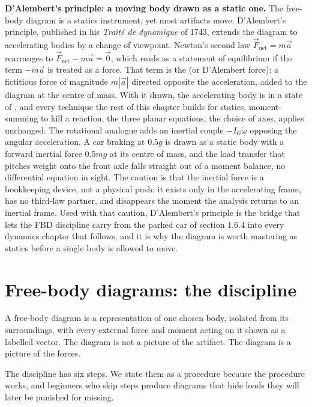 \begin{mastery}
\textbf{D'Alembert's principle: a moving body drawn as a static one.} The
free-body diagram is a statics instrument, yet most artifacts move. D'Alembert's
principle, published in his \emph{Trait\'e de dynamique} of 1743, extends the
diagram to accelerating bodies by a change of viewpoint. Newton's second law
$\vec{F}_{\text{net}} = m\vec{a}$ rearranges to $\vec{F}_{\text{net}} - m\vec{a}
= \vec{0}$, which reads as a statement of equilibrium if the term $-m\vec{a}$ is
treated as a force. That term is the  (or D'Alembert
force): a fictitious force of magnitude $m|\vec{a}|$ directed opposite the
acceleration, added to the diagram at the centre of mass. With it drawn, the
accelerating body is in a state of , and every
technique the rest of this chapter builds for statics, moment-summing to kill a
reaction, the three planar equations, the choice of axes, applies unchanged.
The rotational analogue adds an inertial couple $-I_G\dot\omega$ opposing the
angular acceleration. A car braking at $0.5g$ is drawn as a static body with a
forward inertial force $0.5mg$ at its centre of mass, and the load transfer
that pitches weight onto the front axle falls straight out of a moment balance,
no differential equation in sight. The caution is that the inertial force is a
bookkeeping device, not a physical push: it exists only in the accelerating
frame, has no third-law partner, and disappears the moment the analysis returns
to an inertial frame. Used with that caution, D'Alembert's principle is the
bridge that lets the FBD discipline carry from the parked car of section 1.6.4
into every dynamics chapter that follows, and it is why the diagram is worth
mastering as statics before a single body is allowed to move.
\end{mastery}

\section{Free-body diagrams: the discipline}

A free-body diagram is a representation of one chosen body, isolated
from its surroundings, with every external force and moment acting on
it shown as a labelled vector. The diagram is not a picture of the
artifact. The diagram is a picture of the forces.

The discipline has six steps. We state them as a procedure because the
procedure works, and beginners who skip steps produce diagrams that
hide loads they will later be punished for missing.

